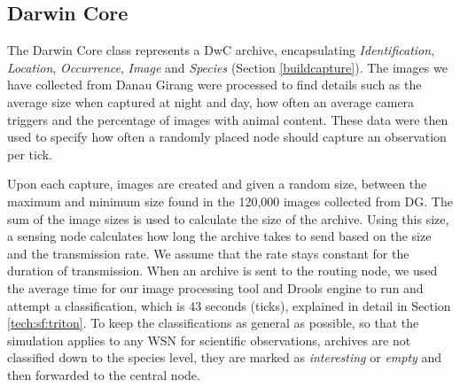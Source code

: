 
\subsection{Darwin Core}
The Darwin Core class represents a DwC archive, encapsulating \textit{Identification}, \textit{Location}, \textit{Occurrence}, \textit{Image} and \textit{Species} (Section \ref{buildcapture}). The images we have collected from Danau Girang were processed to find details such as the average size when captured at night and day, how often an average camera triggers and the percentage of images with animal content. These data were then used to specify how often a randomly placed node should capture an observation per tick.

Upon each capture, images are created and given a random size, between the maximum and minimum size found in the 120,000 images collected from DG. The sum of the image sizes is used to calculate the size of the archive. Using this size, a sensing node calculates how long the archive takes to send based on the size and the transmission rate. We assume that the rate stays constant for the duration of transmission.
When an archive is sent to the routing node, we used the average time for our image processing tool and Drools engine to run and attempt a classification, which is 43 seconds (ticks), explained in detail in Section \ref{tech:sf:triton}. To keep the classifications as general as possible, so that the simulation applies to any WSN for scientific observations, archives are not classified down to the species level, they are marked as \textit{interesting} or \textit{empty} and then forwarded to the central node.

